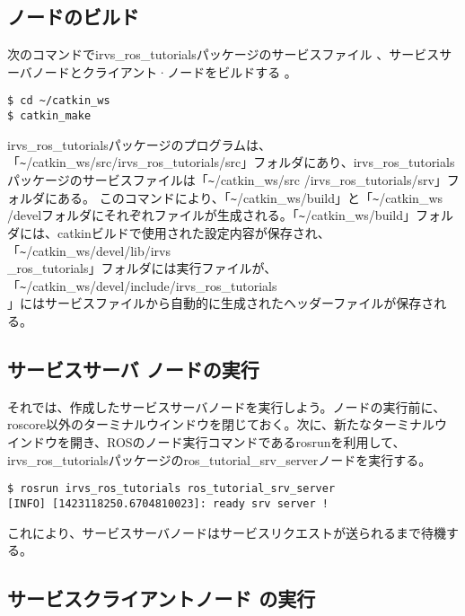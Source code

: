 \subsection{ノードのビルド}

次のコマンドでirvs\_ros\_tutorialsパッケージのサービスファイル 、サービスサーバノードとクライアント·ノードをビルドする  。

\begin{lstlisting}[language=ROS]
$ cd ~/catkin_ws
$ catkin_make
\end{lstlisting}

irvs\_ros\_tutorialsパッケージのプログラムは、「\verb|~|/catkin\_ws/src/irvs\_ros\_tutorials/src」フォルダにあり、irvs\_ros\_tutorialsパッケージのサービスファイルは「\verb|~|/catkin\_ws/src /irvs\_ros\_tutorials/srv」フォルダにある。
このコマンドにより、「\verb|~|/catkin\_ws/build」と「\verb|~|/catkin\_ws /develフォルダにそれぞれファイルが生成される。「\verb|~|/catkin\_ws/build」フォルダには、catkinビルドで使用された設定内容が保存され、「\verb|~|/catkin\_ws/devel/lib/irvs\\\_ros\_tutorials」フォルダには実行ファイルが、「\verb|~|/catkin\_ws/devel/include/irvs\_ros\_tutorials\\」にはサービスファイルから自動的に生成されたヘッダーファイルが保存される。

\subsection{サービスサーバ  ノードの実行}

それでは、作成したサービスサーバノードを実行しよう。ノードの実行前に、roscore以外のターミナルウインドウを閉じておく。次に、新たなターミナルウインドウを開き、ROSのノード実行コマンドであるrosrunを利用して、irvs\_ros\_tutorialsパッケージのros\_tutorial\_srv\_serverノードを実行する。

\begin{lstlisting}[language=ROS]
$ rosrun irvs_ros_tutorials ros_tutorial_srv_server
[INFO] [1423118250.6704810023]: ready srv server !
\end{lstlisting}

これにより、サービスサーバノードはサービスリクエストが送られるまで待機する。

\subsection{サービスクライアントノード  の実行}

